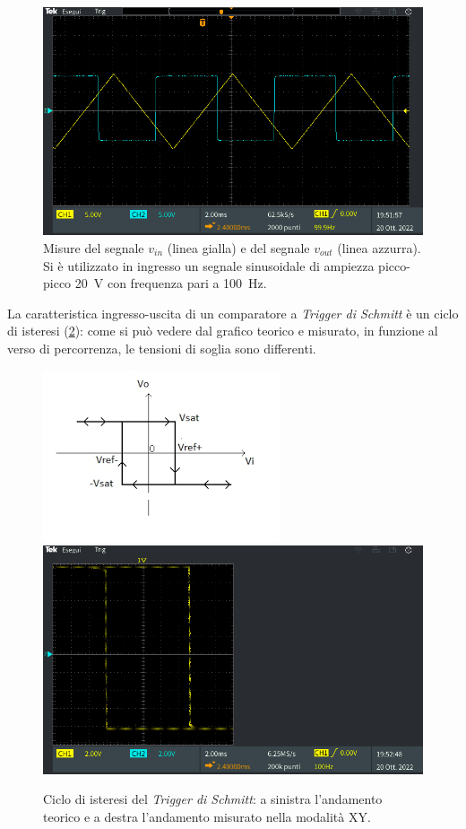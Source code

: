 \begin{figure}[tbh]
	\centering
	\includegraphics[width=\linewidth]{./ImageFiles/Laboratorio 3/TEK00007.PNG}
	\caption{Misure del segnale $v_{in}$ (linea gialla) e del segnale $v_{out}$ (linea azzurra). Si è utilizzato in ingresso un segnale sinusoidale di ampiezza picco-picco \SI{20}{\volt} con frequenza pari a \SI{100}{\hertz}.}
	\label{fig:uscita_circuito_2}
\end{figure}

\noindent
La caratteristica ingresso-uscita di un comparatore a \textit{Trigger di Schmitt} è un ciclo di isteresi (\Fig\ref{fig:ciclo_isteresi}): come si può vedere dal grafico teorico e misurato, in funzione al verso di percorrenza, le tensioni di soglia sono differenti. 
\begin{figure}[h!]
	\centering
	\includegraphics[width=0.4\linewidth]{./ImageFiles/Laboratorio 3/Ciclo di Isteresi.png}
	\includegraphics[width=0.5\linewidth]{./ImageFiles/Laboratorio 3/TEK00008.PNG}
	\caption{Ciclo di isteresi del \textit{Trigger di Schmitt}: a sinistra l'andamento teorico e a destra l'andamento misurato nella modalità XY.}
	\label{fig:ciclo_isteresi}
\end{figure} 

